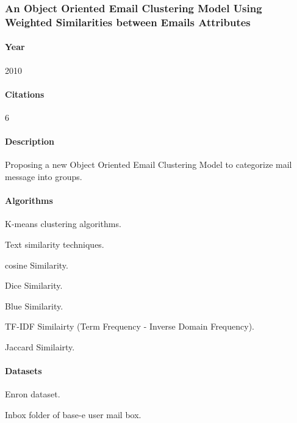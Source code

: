 \documentclass[12pt]{article}
\newenvironment{my_itemize}
{\begin{itemize}
  \setlength{\itemsep}{0cm}
  \setlength{\parskip}{0cm}}
{\end{itemize}}
\begin{document}

\subsubsection{An Object Oriented Email Clustering Model Using Weighted 
	      Similarities between Emails Attributes \cite{NARESH10}}
\paragraph{Year} 2010
\paragraph{Citations}6
\paragraph{Description}
\begin{my_itemize}
    \item Proposing a new Object Oriented Email Clustering Model to categorize 
	  mail message into groups.
\end{my_itemize}

\paragraph{Algorithms}
\begin{my_itemize}
    \item K-means clustering algorithms.
    \item Text similarity techniques.
    \begin{my_itemize}
        \item cosine Similarity.
        \item Dice Similarity.
        \item Blue Similarity.
        \item TF-IDF Similairty (Term Frequency - Inverse Domain Frequency).
        \item Jaccard Similairty.
    \end{my_itemize}
\end{my_itemize}

\paragraph{Datasets}
\begin{my_itemize}
    \item Enron dataset.
    \item Inbox folder of base-e user mail box.
\end{my_itemize}
\end{document}
